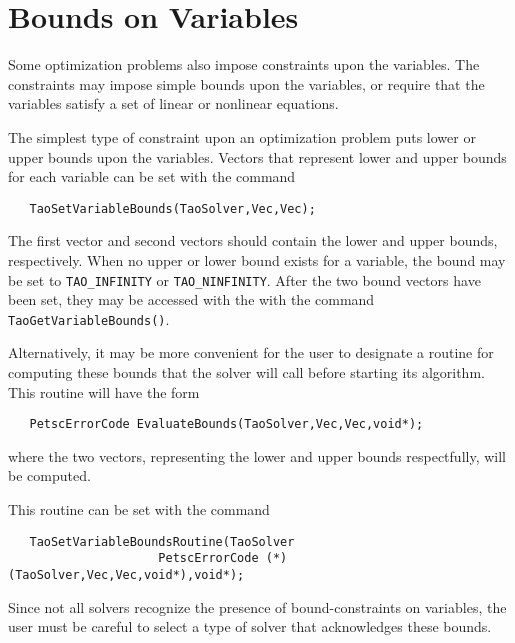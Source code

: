 \section{Bounds on Variables}\label{sec:bounds}

Some optimization problems also impose constraints upon the variables.
The constraints may impose simple bounds upon the variables, or
require that the variables satisfy a set of linear or  nonlinear equations.

The simplest type of constraint upon an optimization problem puts lower
or upper bounds upon the variables. 
Vectors that represent lower and upper bounds for each variable 
can be set with the command  
\begin{verbatim}
   TaoSetVariableBounds(TaoSolver,Vec,Vec);
\end{verbatim}
\noindent
The first vector and second vectors should contain the lower and upper 
bounds, respectively.
When no upper or lower bound exists for a variable, the bound
may be set to {\tt TAO\_INFINITY} or {\tt TAO\_NINFINITY}.
After the two bound vectors have been set, they may be accessed with the
with the command  {\tt TaoGetVariableBounds()}.

Alternatively, it may be more convenient for the user to designate a routine 
for computing these bounds
that the solver will call before starting its algorithm.  This routine will
have the form
\begin{verbatim}
   PetscErrorCode EvaluateBounds(TaoSolver,Vec,Vec,void*);
\end{verbatim}
where the two vectors, representing the lower and upper bounds respectfully, 
will be computed.

This routine can be set with the command
\begin{verbatim}
   TaoSetVariableBoundsRoutine(TaoSolver
                     PetscErrorCode (*)(TaoSolver,Vec,Vec,void*),void*);
\end{verbatim}
   
Since not all solvers recognize the presence of bound-constraints on 
variables, the user must be careful 
to select a type of solver that acknowledges these bounds.

